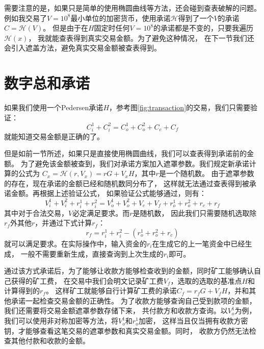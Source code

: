 需要注意的是，如果只是简单的使用椭圆曲线等方法，还会碰到查表破解的问题。
例如我交易了$V=10^8$最小单位的加密货币，使用承诺$\mathcal{H}$得到了一个$V$的承诺$C=\mathcal{H}(V)$。
但是由于在$H$固定时任何$V=10^8$的承诺都是不变的，只要我遍历$\mathcal{H}(x)$，
我就能查表得到真实交易金额。为了避免这种情况，
在下一节我们还会引入遮盖方法，避免真实交易金额被查表得到。

\section{数字总和承诺}\label{sec:amount}

如果我们使用一个Pedersen承诺$H$，参考图\ref{fig:transaction}的交易，我们只需要验证：
%
$$C_i^1 + C_i^2 = C_o^1 + C_o^2 + C_c + C_f$$
%
就能知道交易金额是正确的了。

但是如前一节所述，如果只是直接使用椭圆曲线，我们可以查表得到承诺前的金额。
为了避免该金额被查到，我们对承诺方案加入遮罩参数。我们规定新承诺计算的公式为
$C_x=\mathcal{H}(r,V_x)=rG + V_xH$，其中$r$是一个随机数。
由于遮罩参数的存在，现在承诺的金额已经和随机数同分布了，
这样就无法通过查表得到被承诺金额。再根据上述验证公式，
如果验证公式能够通过，则有：
%
$$V_i^1 + V_i^2 + r_i^1 + r_i^2 = V_o^1 + V_o^2 + V_c + V_f + r_o^1 + r_o^2 + r_c + r_f$$
%
其中对于合法交易，$V$必定满足要求。而$r$是随机数，
因此我们只需要随机选取除$r_f$外其他$r$，并通过下式计算$r_f$：
$$r_f = r_i^1 + r_i^2 - \left(r_o^1 + r_o^2 + r_c\right)$$
%
就可以满足要求。在实际操作中，输入资金的$r_i$在生成它的上一笔资金中已经生成，
一般不需要重新生成，直接查询到上次生成的$r_i$即可。

通过该方式承诺后，为了能够让收款方能够检查收到的金额，同时矿工能够确认自己获得的矿工费，
在交易中我们会明文记录矿工费$V_f$，选取的选取的基准点$H$和计算得到的$r_f$。
这样矿工就能够自行计算矿工费的承诺$C_f = r_fG + V_fH$，并和其他承诺一起检查交易金额的正确性。
为了收款方能够查询自己受到款项的金额，我们还需要将交易金额遮罩参数存储下来，
共付款方和收款方查询。以$V_o^1$为例，我们可以使用非对称加密等方法，将$V_o^1$和$r_o^1$加密，
这样当且仅当拥有收款方密钥，才能够查看这笔交易的遮罩参数和真实交易金额。同时，
收款方仍然无法检查其他付款和收款的金额。

